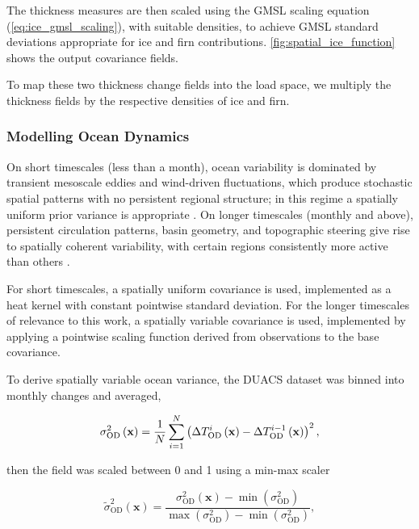 The thickness measures are then scaled using the GMSL scaling equation (\autoref{eq:ice_gmsl_scaling}), with suitable densities, to achieve GMSL standard deviations appropriate for ice and firn contributions. \autoref{fig:spatial_ice_function} shows the output covariance fields.


To map these two thickness change fields into the load space, we multiply the thickness fields by the respective densities of ice and firn.

\subsubsection{Modelling Ocean Dynamics}



On short timescales (less than a month), ocean variability is dominated by transient mesoscale eddies and wind-driven fluctuations, which produce stochastic spatial patterns with no persistent regional structure; in this regime a spatially uniform prior variance is appropriate \autocite{stammerCausesContemporaryRegional2013}. On longer timescales (monthly and above), persistent circulation patterns, basin geometry, and topographic steering give rise to spatially coherent variability, with certain regions consistently more active than others \autocite{koppGeographicVariabilitySeaLevel2015, coulsonDetectionSeaLevel2022, stammerCausesContemporaryRegional2013}.

For short timescales, a spatially uniform covariance is used, implemented as a heat kernel with constant pointwise standard deviation. For the longer timescales of relevance to this work, a spatially variable covariance is used, implemented by applying a pointwise scaling function derived from observations to the base covariance.

To derive spatially variable ocean variance, the DUACS dataset \autocite{copernicusclimatechangeserviceGLOBALOCEANGRIDDED2021} was binned into monthly changes and averaged,

\begin{equation}
    \sigma_{\text{OD}}^2\left(\mathbf{x}\right) = \frac{1}{N} \sum_{i=1}^{N} \left( \Delta T_\text{OD}^i\left(\mathbf{x}\right) - \Delta T_\text{OD}^{i-1}\left(\mathbf{x}\right) \right)^2,
\end{equation}


then the field was scaled between 0 and 1 using a min-max scaler

\begin{equation}
    \tilde{\sigma}_{\text{OD}}^2\left(\mathbf{x}\right) = \frac{\sigma_{\text{OD}}^2\left(\mathbf{x}\right) - \min\left(\sigma_{\text{OD}}^2\right)}{\max\left(\sigma_{\text{OD}}^2\right) - \min\left(\sigma_{\text{OD}}^2\right)},
\end{equation}

